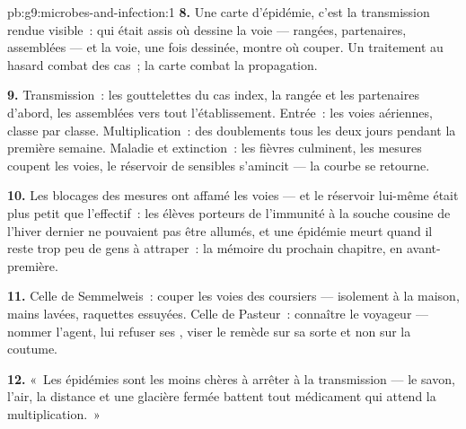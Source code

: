 \begin{solution}{pb:g9:microbes-and-infection:1}
\textbf{8.} Une carte d'épidémie, c'est la transmission
rendue visible~: qui était assis où dessine la voie ---
rangées, partenaires, assemblées --- et la voie, une fois
dessinée, montre où couper. Un traitement au hasard combat
des cas~; la carte combat la propagation.

\textbf{9.} Transmission~: les gouttelettes du cas index,
la rangée et les partenaires d'abord, les assemblées vers
tout l'établissement. Entrée~: les voies aériennes, classe
par classe. Multiplication~: des doublements tous les deux
jours pendant la première semaine. Maladie et extinction~:
les fièvres culminent, les mesures coupent les voies, le
réservoir de sensibles s'amincit --- la courbe se retourne.

\textbf{10.} Les blocages des mesures ont affamé les
voies --- et le réservoir lui-même était plus petit que
l'effectif~: les élèves porteurs de l'immunité à la souche
cousine de l'hiver dernier ne pouvaient pas être allumés, et
une épidémie meurt quand il reste trop peu de gens à
attraper~: la mémoire du prochain chapitre, en avant-première.

\textbf{11.} Celle de Semmelweis~: couper les voies des
coursiers --- isolement à la maison, mains lavées, raquettes
essuyées. Celle de Pasteur~: connaître le voyageur ---
nommer l'agent, lui refuser ses , viser le remède
sur sa sorte et non sur la coutume.

\textbf{12.} «~Les épidémies sont les moins chères à
arrêter à la transmission --- le savon, l'air, la distance
et une glacière fermée battent tout médicament qui attend la
multiplication.~»
\end{solution}
